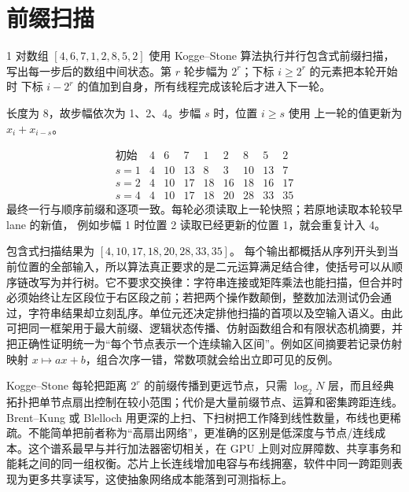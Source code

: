 \chapter{前缀扫描}

\begin{solutionexercise}{1}
\problemheading 对数组 $[4,6,7,1,2,8,5,2]$ 使用 Kogge--Stone 算法执行并行包含式前缀扫描，
写出每一步后的数组中间状态。第 $r$ 轮步幅为 $2^r$；下标 $i\ge2^r$ 的元素把本轮开始时
下标 $i-2^r$ 的值加到自身，所有线程完成该轮后才进入下一轮。

\approachheading 长度为 8，故步幅依次为 1、2、4。步幅 $s$ 时，位置 $i\ge s$ 使用
上一轮的值更新为 $x_i+x_{i-s}$。

\answerheading
\[
\begin{array}{c|rrrrrrrr}
\text{初始}&4&6&7&1&2&8&5&2\\
s=1&4&10&13&8&3&10&13&7\\
s=2&4&10&17&18&16&18&16&17\\
s=4&4&10&17&18&20&28&33&35
\end{array}
\]
最终一行与顺序前缀和逐项一致。每轮必须读取上一轮快照；若原地读取本轮较早 lane 的新值，
例如步幅 1 时位置 2 读取已经更新的位置 1，就会重复计入 4。

\conclusionheading 包含式扫描结果为 $[4,10,17,18,20,28,33,35]$。
\discussionheading
{}每个输出都概括从序列开头到当前位置的全部输入，所以算法真正要求的是二元运算满足结合律，使括号可以从顺序链改写为并行树。它不要求交换律：字符串连接或矩阵乘法也能扫描，但合并时必须始终让左区段位于右区段之前；若把两个操作数颠倒，整数加法测试仍会通过，字符串结果却立刻乱序。单位元还决定排他扫描的首项以及空输入语义。由此可把同一框架用于最大前缀、逻辑状态传播、仿射函数组合和有限状态机摘要，并把正确性证明统一为“每个节点表示一个连续输入区间”。例如区间摘要若记录仿射映射 $x\mapsto ax+b$，组合次序一错，常数项就会给出立即可见的反例。

Kogge--Stone 每轮把距离 $2^r$ 的前缀传播到更远节点，只需 $\log_2N$ 层，而且经典拓扑把单节点扇出控制在较小范围；代价是大量前缀节点、运算和密集跨距连线。Brent--Kung 或 Blelloch 用更深的上扫、下扫树把工作降到线性数量，布线也更稀疏。不能简单把前者称为“高扇出网络”，更准确的区别是低深度与节点/连线成本。这个谱系最早与并行加法器密切相关，在 GPU 上则对应屏障数、共享事务和能耗之间的同一组权衡。芯片上长连线增加电容与布线拥塞，软件中同一跨距则表现为更多共享读写，这使抽象网络成本能落到可测指标上。


\end{solutionexercise}
